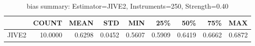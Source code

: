 \begin{table}[ht]
\centering
\caption{bias summary: Estimator=JIVE2, Instruments=250, Strength=0.40}
\begin{tabular}{lrrrrrrrr}
\toprule
 & COUNT & MEAN & STD & MIN & 25\% & 50\% & 75\% & MAX \\
\midrule
JIVE2 & 10.0000 & 0.6298 & 0.0452 & 0.5607 & 0.5909 & 0.6419 & 0.6662 & 0.6872 \\
\bottomrule
\end{tabular}
\end{table}
